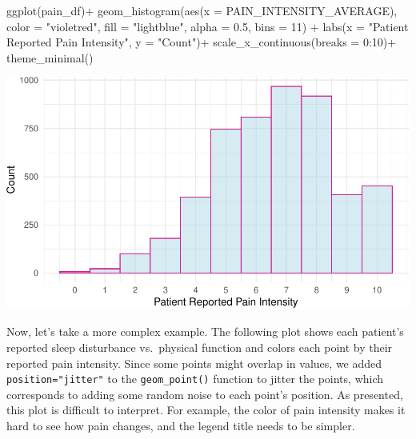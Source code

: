 \documentclass[
  letterpaper,
]{latex/krantz}
\makeatletter
\newenvironment{Shaded}{\begin{snugshade}}{\end{snugshade}}
\newcommand{\AttributeTok}[1]{\textcolor[rgb]{0.40,0.45,0.13}{#1}}
\newcommand{\DecValTok}[1]{\textcolor[rgb]{0.68,0.00,0.00}{#1}}
\newcommand{\FloatTok}[1]{\textcolor[rgb]{0.68,0.00,0.00}{#1}}
\newcommand{\FunctionTok}[1]{\textcolor[rgb]{0.28,0.35,0.67}{#1}}
\newcommand{\NormalTok}[1]{\textcolor[rgb]{0.00,0.23,0.31}{#1}}
\newcommand{\SpecialCharTok}[1]{\textcolor[rgb]{0.37,0.37,0.37}{#1}}
\newcommand{\StringTok}[1]{\textcolor[rgb]{0.13,0.47,0.30}{#1}}
\newenvironment{kframe}{%
\medskip{}
\setlength{\fboxsep}{.8em}
 \def\at@end@of@kframe{}%
 \ifinner\ifhmode%
  \def\at@end@of@kframe{\end{minipage}}%
  \begin{minipage}{\columnwidth}%
 \fi\fi%
 \def\FrameCommand##1{\hskip\@totalleftmargin \hskip-\fboxsep
 \colorbox{shadecolor}{##1}\hskip-\fboxsep
     \hskip-\linewidth \hskip-\@totalleftmargin \hskip\columnwidth}%
 \MakeFramed {\advance\hsize-\width
   \@totalleftmargin\z@ \linewidth\hsize
   \@setminipage}}%
 {\par\unskip\endMakeFramed%
 \at@end@of@kframe}
\renewenvironment{Shaded}{\begin{kframe}}{\end{kframe}}
\makeatother
\begin{document}
\begin{Shaded}
\begin{Highlighting}[]
\FunctionTok{ggplot}\NormalTok{(pain\_df)}\SpecialCharTok{+}
  \FunctionTok{geom\_histogram}\NormalTok{(}\FunctionTok{aes}\NormalTok{(}\AttributeTok{x =}\NormalTok{ PAIN\_INTENSITY\_AVERAGE), }\AttributeTok{color =} \StringTok{"violetred"}\NormalTok{, }
                 \AttributeTok{fill =} \StringTok{"lightblue"}\NormalTok{, }\AttributeTok{alpha =} \FloatTok{0.5}\NormalTok{, }\AttributeTok{bins =} \DecValTok{11}\NormalTok{) }\SpecialCharTok{+}
  \FunctionTok{labs}\NormalTok{(}\AttributeTok{x =} \StringTok{"Patient Reported Pain Intensity"}\NormalTok{, }\AttributeTok{y =} \StringTok{"Count"}\NormalTok{)}\SpecialCharTok{+}
  \FunctionTok{scale\_x\_continuous}\NormalTok{(}\AttributeTok{breaks =} \DecValTok{0}\SpecialCharTok{:}\DecValTok{10}\NormalTok{)}\SpecialCharTok{+}
  \FunctionTok{theme\_minimal}\NormalTok{()}
\end{Highlighting}
\end{Shaded}

\begin{center}
\includegraphics[width=1\textwidth,height=\textheight]{book/visualization_ggplot_files/figure-pdf/unnamed-chunk-8-1.pdf}
\end{center}

Now, let's take a more complex example. The following plot shows each
patient's reported sleep disturbance vs.~physical function and colors
each point by their reported pain intensity. Since some points might
overlap in values, we added \texttt{position="jitter"} to the
\texttt{geom\_point()} function to jitter the points, which corresponds
to adding some random noise to each point's position. As presented, this
plot is difficult to interpret. For example, the color of pain intensity
makes it hard to see how pain changes, and the legend title needs to be
simpler.
\end{document}
